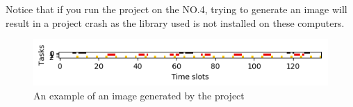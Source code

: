 \documentclass[a4paper,11pt]{article}
\begin{document}
  \noindent Notice that if you run the project on the NO.4, trying to generate an image will result in a project crash as the library used is not installed on these computers.
  \begin{figure}[ht!]
    \centering
    \includegraphics{img/schedule1.png}
    \caption{An example of an image generated by the project}
    \label{fig:scheduling-output-example}
  \end{figure}
\end{document}
